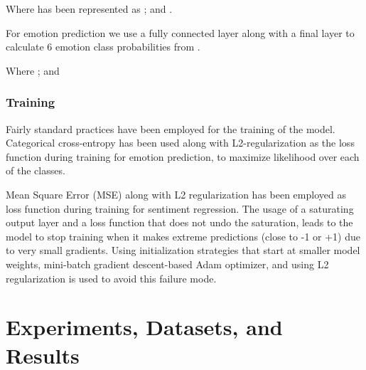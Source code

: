 \documentclass[11pt,a4paper]{article}
\begin{document}
Where  has been represented as ; and .

For emotion prediction we use a fully connected layer along with a final  layer to calculate 6 emotion class probabilities from .





Where ;  and 

\subsubsection{Training}
Fairly standard practices have been employed for the training of the model. Categorical cross-entropy has been used along with L2-regularization as the loss function during training for emotion prediction, to maximize likelihood over each of the classes.

Mean Square Error (MSE) along with L2 regularization has been employed as loss function during training for sentiment regression. The usage of a saturating output layer and a loss function that does not undo the saturation, leads to the model to stop training when it makes extreme predictions (close to -1 or +1) due to very small gradients. Using initialization strategies that start at smaller model weights, mini-batch gradient descent-based Adam \cite{adam} optimizer, and using L2 regularization is used to avoid this failure mode. 


\section{Experiments, Datasets, and Results}
\end{document}

